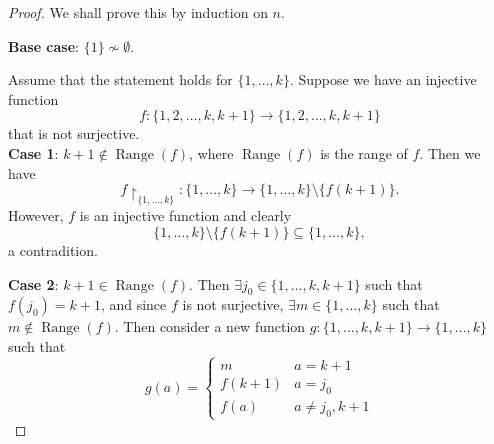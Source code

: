 \documentclass[notoc,notitlepage]{tufte-book}
\DeclareMathOperator{\Range}{Range }
\begin{document}
\begin{proof}
  We shall prove this by induction on $n$.

  \noindent\textbf{Base case}: $\{1\} \nsim \emptyset$.

  \noindent Assume that the statement holds for $\{1, \ldots, k\}$. Suppose we have an injective function
  \begin{equation*}
    f : \{ 1, 2, \ldots, k, k + 1 \} \to \{ 1, 2, \ldots, k, k + 1 \}
  \end{equation*}
  that is not surjective. \\
  \noindent\textbf{Case 1}: $k + 1 \notin \Range(f)$, where $\Range(f)$ is the range of $f$. Then we have
  \begin{equation*}
    f \restriction_{\{1, \ldots, k\}} : \{1, \ldots, k \} \to \{1, \ldots, k\} \setminus \{ f(k + 1) \}.
  \end{equation*}
  However, $f$ is an injective function and clearly
  \begin{equation*}
    \{1, \ldots, k \} \setminus \{ f(k + 1) \} \subseteq \{1, \ldots, k\},
  \end{equation*}
  a contradition.

  \noindent\textbf{Case 2}: $k + 1 \in \Range(f)$. Then $\exists j_0 \in \{1, \ldots, k, k + 1 \}$ such that $f(j_0) = k + 1$, and since $f$ is not surjective, $\exists m \in \{1, \ldots, k\}$ such that $m \notin \Range(f)$. Then consider a new function $g: \{1, \ldots, k, k + 1\} \to \{1, \ldots, k\}$ such that
  \begin{equation*}
    g(a) = \begin{cases}
      m        & a = k + 1 \\
      f(k + 1) & a = j_0 \\
      f(a)     & a \neq j_0, k + 1
    \end{cases}
  \end{equation*}
\end{proof}
\end{document}
